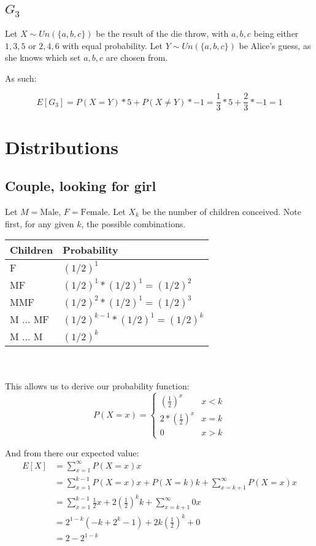 \documentclass[a4paper]{scrreprt}
\begin{document}
\subsection{$G_3$}

Let $X \sim Un(\{a, b, c\})$ be the result of the die throw, with $a, b, c$
being either $1, 3, 5$ or $2, 4, 6$ with equal probability. Let $Y \sim Un(\{a,
b, c\})$ be Alice's guess, as she knows which set $a, b, c$ are chosen from.

As such:

\[
	E[G_3] = P(X = Y) * 5 + P(X \neq Y) * -1 = \frac{1}{3} * 5 + \frac{2}{3} * -1 = 1
\]


\section{Distributions}

\subsection{Couple, looking for girl}

Let $M = \text{Male}$, $F = \text{Female}$. Let $X_k$ be the number of children
conceived. Note first, for any given $k$, the possible combinations.
\\

\begin{tabular}{|l|l|}
	\hline
	Children & Probability \\
	\hline
	$\text{F}$ & $(1/2)^1$ \\
	\hline
	$\text{MF}$ & $(1/2)^1 * (1/2)^1 = (1/2)^2$ \\
	\hline
	$\text{MMF}$ & $(1/2)^2 * (1/2)^1 = (1/2)^3$ \\
	\hline
	$\text{M \ldots\ MF}$ & $(1/2)^{k-1} * (1/2)^1 = (1/2)^k$ \\
	\hline
	$\text{M \ldots\ M}$ & $(1/2)^{k}$ \\
	\hline
\end{tabular}
\\
\\
This allows us to derive our probability function:
\[
	P(X=x) =
	\begin{cases}
		\left(\frac{1}{2}\right)^x & x < k \\
		2 * \left(\frac{1}{2}\right)^x & x = k \\
		0 & x > k
	\end{cases}
\]

And from there our expected value:
\begin{align*}
	E[X] & = \sum_{x=1}^{\infty}{P(X=x) x} \\
	& = \sum_{x=1}^{k-1}{P(X=x) x} + P(X=k) k + \sum_{x=k+1}^{\infty}{P(X=x) x} \\
	& = \sum_{x=1}^{k-1}{\frac{1}{2} x} + 2 \left(\frac{1}{2}\right)^k k + \sum_{x=k+1}^{\infty}{0 x} \\
	& = 2^{1-k} (-k +2^k -1) + 2k \left(\frac{1}{2}\right)^k + 0 \\
	& = 2 - 2^{1-k}
\end{align*}
\end{document}
